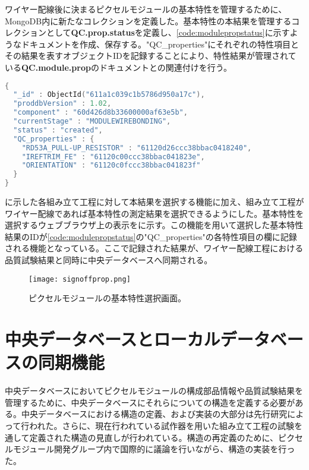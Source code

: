 ワイヤー配線後に決まるピクセルモジュールの基本特性を管理するために、MongoDB内に新たなコレクションを定義した。基本特性の本結果を管理するコレクションとして\textbf{QC.prop.status}を定義し、\cref{code:modulepropstatus}に示すようなドキュメントを作成、保存する。"QC\_properties"にそれぞれの特性項目とその結果を表すオブジェクトIDを記録することにより、特性結果が管理されている\textbf{QC.module.prop}のドキュメントとの関連付けを行う。


\begin{lstlisting}[caption=ピクセルモジュールの組み立て工程を管理するためのドキュメントの一部。,label=code:modulepropstatus, language=C++]
{
  "_id" : ObjectId("611a1c039c1b5786d950a17c"),
  "proddbVersion" : 1.02,
  "component" : "60d426d8b33600000af63e5b",
  "currentStage" : "MODULEWIREBONDING",
  "status" : "created",
  "QC_properties" : {
    "RD53A_PULL-UP_RESISTOR" : "61120d26ccc38bbac0418240",
    "IREFTRIM_FE" : "61120c00ccc38bbac041823e",
    "ORIENTATION" : "61120c0fccc38bbac041823f"
  }
}
\end{lstlisting}

に示した各組み立て工程に対して本結果を選択する機能に加え、組み立て工程がワイヤー配線であれば基本特性の測定結果を選択できるようにした。基本特性を選択するウェブブラウザ上の表示をに示す。この機能を用いて選択した基本特性結果のIDが\cref{code:modulepropstatus}の"QC\_properties"の各特性項目の欄に記録される機能となっている。ここで記録された結果が、ワイヤー配線工程における品質試験結果と同時に中央データベースへ同期される。

\begin{figure}[tbp]
  \centering
  \texttt{[image: signoffprop.png]}
  \caption[ピクセルモジュールの基本特性選択画面]{ピクセルモジュールの基本特性選択画面。}
  \label{fig:sign-off-prop}
\end{figure}

\section{中央データベースとローカルデータベースの同期機能}
\label{sec:douki}

中央データベースにおいてピクセルモジュールの構成部品情報や品質試験結果を管理するために、中央データベースにそれらについての構造を定義する必要がある。中央データベースにおける構造の定義、および実装の大部分は先行研究\cite{oku}によって行われた。さらに、現在行われている試作器を用いた組み立て工程の試験を通して定義された構造の見直しが行われている。構造の再定義のために、ピクセルモジュール開発グループ内で国際的に議論を行いながら、構造の実装を行った。

